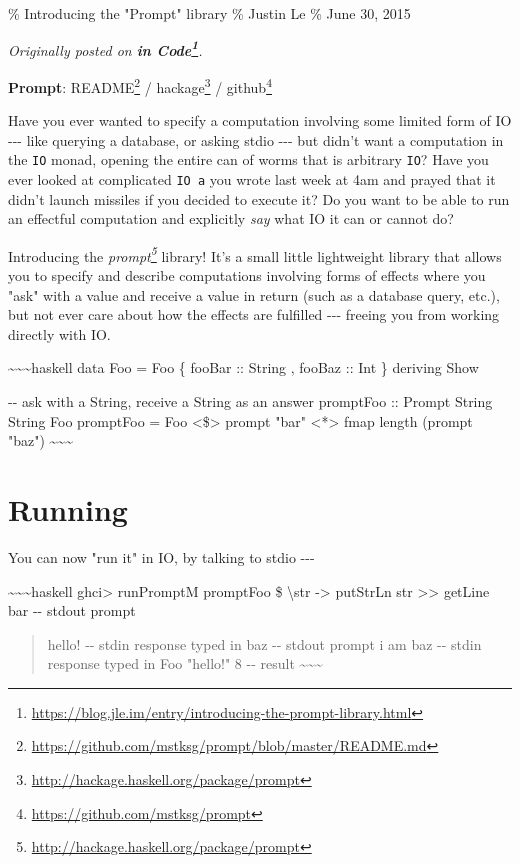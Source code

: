 \documentclass[]{article}
\renewcommand{\href}[2]{#2\footnote{\url{#1}}}
\begin{document}
\% Introducing the "Prompt" library \% Justin Le \% June 30, 2015

\emph{Originally posted on
\textbf{\href{https://blog.jle.im/entry/introducing-the-prompt-library.html}{in
Code}}.}

\textbf{Prompt}:
\href{https://github.com/mstksg/prompt/blob/master/README.md}{README} /
\href{http://hackage.haskell.org/package/prompt}{hackage} /
\href{https://github.com/mstksg/prompt}{github}

Have you ever wanted to specify a computation involving some limited form of IO
-\/-\/- like querying a database, or asking stdio -\/-\/- but didn't want a
computation in the \texttt{IO} monad, opening the entire can of worms that is
arbitrary \texttt{IO}? Have you ever looked at complicated \texttt{IO\ a} you
wrote last week at 4am and prayed that it didn't launch missiles if you decided
to execute it? Do you want to be able to run an effectful computation and
explicitly \emph{say} what IO it can or cannot do?

Introducing the \emph{\href{http://hackage.haskell.org/package/prompt}{prompt}}
library! It's a small little lightweight library that allows you to specify and
describe computations involving forms of effects where you "ask" with a value
and receive a value in return (such as a database query, etc.), but not ever
care about how the effects are fulfilled -\/-\/- freeing you from working
directly with IO.

\textasciitilde{}\textasciitilde{}\textasciitilde{}haskell data Foo = Foo \{
fooBar :: String , fooBaz :: Int \} deriving Show

-\/- ask with a String, receive a String as an answer promptFoo :: Prompt String
String Foo promptFoo = Foo \textless{}\$\textgreater{} prompt "bar"
\textless{}*\textgreater{} fmap length (prompt "baz")
\textasciitilde{}\textasciitilde{}\textasciitilde{}

\section{Running}

You can now "run it" in IO, by talking to stdio -\/-\/-

\textasciitilde{}\textasciitilde{}\textasciitilde{}haskell ghci\textgreater{}
runPromptM promptFoo \$ \textbackslash{}str -\textgreater{} putStrLn str
\textgreater{}\textgreater{} getLine bar -\/- stdout prompt

\begin{quote}
hello! -\/- stdin response typed in baz -\/- stdout prompt i am baz -\/- stdin
response typed in Foo "hello!" 8 -\/- result
\textasciitilde{}\textasciitilde{}\textasciitilde{}
\end{quote}
\end{document}
